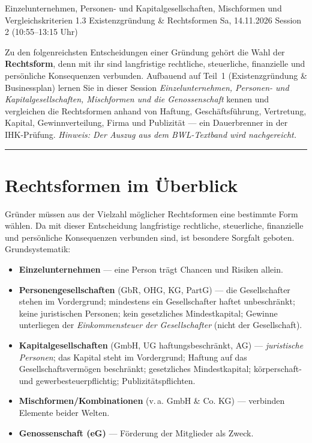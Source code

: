 \documentclass[11pt, a4paper]{article}
\begin{document}
%
  {Einzelunternehmen, Personen- und Kapitalgesellschaften, Mischformen und Vergleichskriterien}%
  {1.3 Existenzgründung \& Rechtsformen}%
  {Sa, 14.11.2026 \textperiodcentered{} Session 2 (10:55--13:15 Uhr)}

\begin{merksatz}[title={\bfseries Worum geht es in Teil 2?}]
Zu den folgenreichsten Entscheidungen einer Gründung gehört die Wahl der
\textbf{Rechtsform}, denn mit ihr sind langfristige rechtliche, steuerliche, finanzielle
und persönliche Konsequenzen verbunden. Aufbauend auf Teil~1 (Existenzgründung \&
Businessplan) lernen Sie in dieser Session \emph{Einzelunternehmen, Personen- und
Kapitalgesellschaften, Mischformen und die Genossenschaft} kennen und vergleichen die
Rechtsformen anhand von Haftung, Geschäftsführung, Vertretung, Kapital,
Gewinnverteilung, Firma und Publizität --- ein Dauerbrenner in der IHK-Prüfung.
\emph{Hinweis: Der Auszug aus dem BWL-Textband wird nachgereicht.}
\end{merksatz}

\tableofcontents
\vspace{1em}
\hrule
\vspace{1em}

\section{Rechtsformen im Überblick}

Gründer müssen aus der Vielzahl möglicher Rechtsformen eine bestimmte Form wählen. Da mit
dieser Entscheidung langfristige rechtliche, steuerliche, finanzielle und persönliche
Konsequenzen verbunden sind, ist besondere Sorgfalt geboten. Grundsystematik:

\begin{itemize}
  \item \textbf{Einzelunternehmen} --- eine Person trägt Chancen und Risiken allein.
  \item \textbf{Personengesellschaften} (GbR, OHG, KG, PartG) --- die Gesellschafter
    stehen im Vordergrund; mindestens ein Gesellschafter haftet unbeschränkt; keine
    juristischen Personen; kein gesetzliches Mindestkapital; Gewinne unterliegen der
    \emph{Einkommensteuer der Gesellschafter} (nicht der Gesellschaft).
  \item \textbf{Kapitalgesellschaften} (GmbH, UG haftungsbeschränkt, AG) ---
    \emph{juristische Personen}; das Kapital steht im Vordergrund; Haftung auf das
    Gesellschaftsvermögen beschränkt; gesetzliches Mindestkapital; körperschaft- und
    gewerbesteuerpflichtig; Publizitätspflichten.
  \item \textbf{Mischformen/Kombinationen} (v.\,a. GmbH \& Co. KG) --- verbinden Elemente
    beider Welten.
  \item \textbf{Genossenschaft (eG)} --- Förderung der Mitglieder als Zweck.
\end{itemize}
\end{document}

